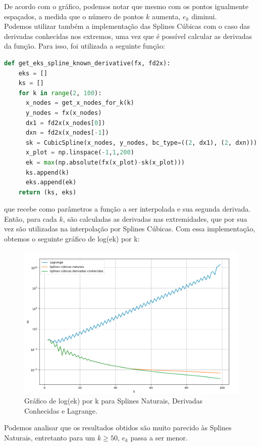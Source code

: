 \documentclass[12pt]{article}
\begin{document}
De acordo com o gráfico, podemos notar que mesmo com os pontos igualmente espaçados, a medida que o número de pontos $k$ aumenta, $e_k$ diminui.\\
Podemos utilizar também a implementação das Splines Cúbicas com o caso das derivadas conhecidas nos extremos, uma vez que é possível calcular as derivadas da função. Para isso, foi utilizada a seguinte função:\\

\begin{lstlisting}[language=Python]
  def get_eks_spline_known_derivative(fx, fd2x):
    eks = []
    ks = []
    for k in range(2, 100):
      x_nodes = get_x_nodes_for_k(k)
      y_nodes = fx(x_nodes)
      dx1 = fd2x(x_nodes[0])
      dxn = fd2x(x_nodes[-1])
      sk = CubicSpline(x_nodes, y_nodes, bc_type=((2, dx1), (2, dxn)))
      x_plot = np.linspace(-1,1,200)
      ek = max(np.absolute(fx(x_plot)-sk(x_plot)))
      ks.append(k)
      eks.append(ek)
    return (ks, eks)
\end{lstlisting}

que recebe como parâmetros a função a ser interpolada e sua segunda derivada. Então, para cada $k$, são calculadas as derivadas nas extremidades, que por sua vez são utilizadas na interpolação por Splines Cúbicas. Com essa implementação, obtemos o seguinte gráfico de log(ek) por k:

\begin{figure}[H]
  \begin{center}
    \includegraphics[width=0.8\linewidth]{splines_2.png}
  \end{center}
  \caption{Gráfico de log(ek) por k para Splines Naturais, Derivadas Conhecidas e Lagrange.}
  \label{fig:leastsquares1}
\end{figure}

Podemos analisar que os resultados obtidos são muito parecido às Splines Naturais, entretanto para um $k \geq 50$, $e_k$ passa a ser menor.\\
\end{document}
